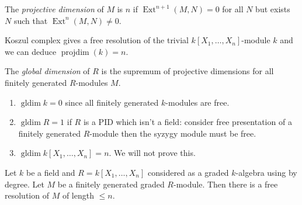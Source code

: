 \documentclass[a4paper]{article}
\DeclareMathOperator{\Ext}{Ext}
\DeclareMathOperator{\projdim}{projdim} %
\DeclareMathOperator{\gldim}{gldim} %
\begin{document}
\begin{definition}
  The \emph{projective dimension} of \(M\) is \(n\)  if \(\Ext^{n + 1}(M, N) = 0\) for all \(N\) but exists \(N\) such that \(\Ext^n(M, N) \ne 0\).
\end{definition}

\begin{eg}
  Koszul complex gives a free resolution of the trivial \(k[X_1, \dots, X_n]\)-module \(k\) and we can deduce \(\projdim(k) = n\).
\end{eg}

\begin{definition}
  The \emph{global dimension} of \(R\) is the supremum of projective dimensions for all finitely generated \(R\)-modules \(M\).
\end{definition}

\begin{eg}\leavevmode
  \begin{enumerate}
  \item \(\gldim k = 0\) since all finitely generated \(k\)-modules are free.
  \item \(\gldim R = 1\) if \(R\) is a PID which isn't a field: consider free presentation of a finitely generated \(R\)-module then the syzygy module must be free.
  \item \(\gldim k[X_1, \dots, X_n] = n\). We will not prove this.
  \end{enumerate}
\end{eg}

\begin{theorem}
  Let \(k\) be a field and \(R = k[X_1, \dots, X_n]\) considered as a graded \(k\)-algebra using by degree. Let \(M\) be a finitely generated graded \(R\)-module. Then there is a free resolution of \(M\) of length \(\leq n\).
\end{theorem}
\end{document}
